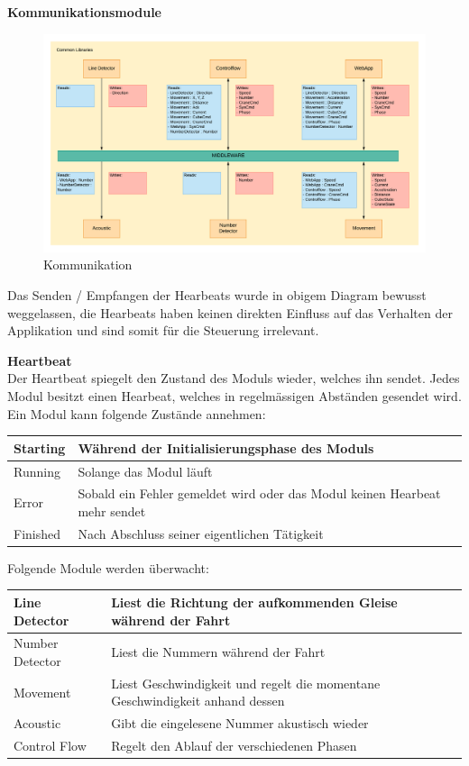 \documentclass[../../main.tex]{subfiles}
\begin{document}
\pagebreak


\textbf{Kommunikationsmodule} \\
\begin{figure}[H] \centering
  \includegraphics[width=1\textwidth]{Architektur}
  \caption{Kommunikation}
  \label{fig:Kommunikation}
\end{figure}
Das Senden / Empfangen der Hearbeats wurde in obigem Diagram bewusst weggelassen, die Hearbeats haben keinen direkten Einfluss auf das Verhalten der Applikation und sind somit für die Steuerung irrelevant.

\textbf{Heartbeat} \\
Der Heartbeat spiegelt den Zustand des Moduls wieder, welches ihn sendet.
Jedes Modul besitzt einen Hearbeat, welches in regelmässigen Abständen gesendet wird. Ein Modul kann folgende Zustände annehmen:
\begin{table}[H]
    \begin{tabular}{ll}
    \hline
    Starting & Während der Initialisierungsphase des Moduls \\ \hline
    Running & Solange das Modul läuft\\ \hline
    Error & Sobald ein Fehler gemeldet wird oder das Modul keinen Hearbeat mehr sendet\\ \hline
    Finished & Nach Abschluss seiner eigentlichen Tätigkeit\\ \hline
    \end{tabular}
\end{table} 
Folgende Module werden überwacht:
\begin{table}[H]
    \begin{tabular}{ll}
    \hline
    Line Detector & Liest die Richtung der aufkommenden Gleise während der Fahrt \\ \hline
    Number Detector & Liest die Nummern während der Fahrt\\ \hline
    Movement & Liest Geschwindigkeit und regelt die momentane Geschwindigkeit anhand dessen\\ \hline
    Acoustic & Gibt die eingelesene Nummer akustisch wieder\\ \hline
    Control Flow & Regelt den Ablauf der verschiedenen Phasen \\ \hline
    \end{tabular}
\end{table}
\end{document}
